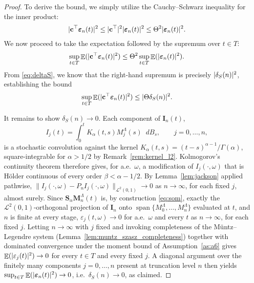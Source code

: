 \documentclass[11pt, a4paper]{article}
\theoremstyle{theoremstyle}
\theoremstyle{definitionstyle}
\newcommand{\dd}{\mathop{}\!d}
\DeclareMathOperator{\EE}{\mathbb E}
\DeclareMathOperator{\linspan}{span}
\DeclarePairedDelimiter{\abs}{\lvert}{\rvert}
\begin{document}
\begin{proof}
    To derive the bound, we simply utilize the Cauchy--Schwarz inequality for the inner product:
    \begin{equation}
        \abs{\mathbf c^\top \boldsymbol \varepsilon_n(t)}^2 \leq \abs{\mathbf c^\top}^2 \abs{\boldsymbol \varepsilon_n(t)}^2 \leq \Theta^2 \abs{\boldsymbol \varepsilon_n(t)}^2.
    \end{equation}
    We now proceed to take the expectation followed by the supremum over $t \in T$:
    \begin{equation}
        \sup_{t \in T} \EE (\abs{\mathbf c^\top \boldsymbol \varepsilon_n(t)}^2) \leq \Theta^2 \sup_{t \in T} \EE (\abs{\boldsymbol \varepsilon_n(t)}^2).
    \end{equation}
    From \eqref{eq:deltaS}, we know that the right-hand supremum is precisely $\abs{\delta_S(n)}^2$, establishing the bound
    \begin{equation}
        \sup_{t \in T} \EE (\abs{\mathbf c^\top \boldsymbol \varepsilon_n(t)}^2) \leq \abs{\Theta \delta_S(n)}^2.
    \end{equation}

    It remains to show $\delta_S(n) \to 0$. Each component of $\mathbf I_n(t)$,
    \begin{equation}
        I_j(t) = \int_0^t K_\alpha(t,s) M_j^\Lambda(s)\dd{B_s}, \qquad j = 0, \dots, n,
    \end{equation}
    is a stochastic convolution against the kernel $K_\alpha(t,s) = (t-s)^{\alpha-1}/\Gamma(\alpha)$, square-integrable for $\alpha>1/2$ by Remark~\ref{rem:kernel_l2}. Kolmogorov's continuity theorem \cite{DaPratoZabczyk2014} therefore gives, for a.e.\ $\omega$, a modification of $I_j(\cdot,\omega)$ that is H\"older continuous of every order $\beta<\alpha-1/2$. By Lemma~\ref{lem:jackson} applied pathwise, $\|I_j(\cdot,\omega) - P_nI_j(\cdot,\omega)\|_{\mathcal L^2(0,1)} \to 0$ as $n\to\infty$, for each fixed $j$, almost surely. Since $\mathbf S_\alpha\mathbf M_n^\Lambda(t)$ is, by construction \eqref{eq:som}, exactly the $\mathcal L^2(0,1)$-orthogonal projection of $\mathbf I_n$ onto $\linspan\{M_0^\Lambda,\dots,M_n^\Lambda\}$ evaluated at $t$, and $n$ is finite at every stage, $\varepsilon_j(t,\omega) \to 0$ for a.e.\ $\omega$ and every $t$ as $n \to \infty$, for each fixed $j$. Letting $n\to\infty$ with $j$ fixed and invoking completeness of the M\"untz--Legendre system (Lemma~\ref{lem:muntz_szasz_completeness}) together with dominated convergence \cite{folland1999real} under the moment bound of Assumption~\ref{as:a6} gives $\EE(\abs{\varepsilon_j(t)}^2) \to 0$ for every $t\in T$ and every fixed $j$. A diagonal argument over the finitely many components $j=0,\dots,n$ present at truncation level $n$ then yields $\sup_{t\in T}\EE(\abs{\boldsymbol\varepsilon_n(t)}^2) \to 0$, i.e.\ $\delta_S(n)\to 0$, as claimed.
\end{proof}
\end{document}
